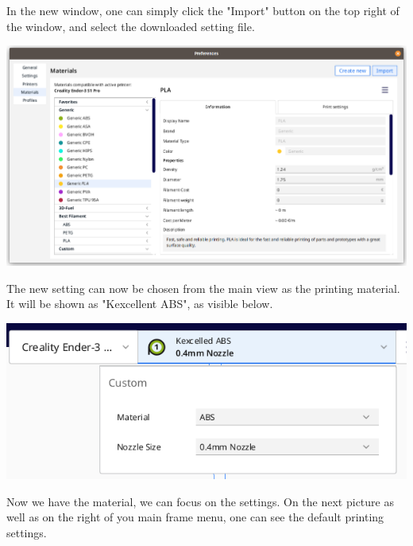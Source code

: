 \documentclass[a4paper,11pt]{article}
\begin{document}
In the new window, one can simply click the "Import" button on the top right of the window,
and select the downloaded setting file.

\begin{center}
\includegraphics[width=.9\linewidth]{img/cura/5.png}
\end{center}

The new setting can now be chosen from the main view as the printing material.
It will be shown as "Kexcellent ABS", as visible below.

\begin{center}
\includegraphics[width=.9\linewidth]{img/cura/6.png}
\end{center}

Now we have the material, we can focus on the settings.
On the next picture as well as on the right of you main frame menu, one
can see the default printing settings.
\end{document}
